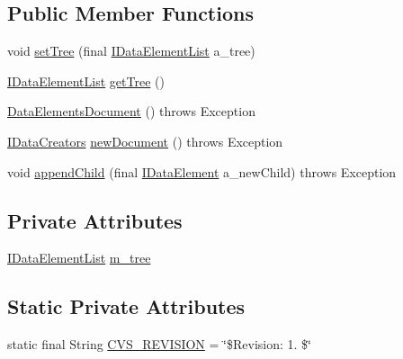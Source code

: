 \subsection*{Public Member Functions}
\begin{DoxyCompactItemize}
\item 
void \hyperlink{classorg_1_1jgap_1_1data_1_1_data_elements_document_a501abddaa9785533fab69835793c707d}{set\-Tree} (final \hyperlink{interfaceorg_1_1jgap_1_1data_1_1_i_data_element_list}{I\-Data\-Element\-List} a\-\_\-tree)
\item 
\hyperlink{interfaceorg_1_1jgap_1_1data_1_1_i_data_element_list}{I\-Data\-Element\-List} \hyperlink{classorg_1_1jgap_1_1data_1_1_data_elements_document_ac3290fdfcf6e71391fbf783c6aa0ffc9}{get\-Tree} ()
\item 
\hyperlink{classorg_1_1jgap_1_1data_1_1_data_elements_document_a0e9c99f7b7e45029e52626552aa84e23}{Data\-Elements\-Document} ()  throws Exception 
\item 
\hyperlink{interfaceorg_1_1jgap_1_1data_1_1_i_data_creators}{I\-Data\-Creators} \hyperlink{classorg_1_1jgap_1_1data_1_1_data_elements_document_abc37b0421a3f0694a0cd99e0f4bfb58f}{new\-Document} ()  throws Exception 
\item 
void \hyperlink{classorg_1_1jgap_1_1data_1_1_data_elements_document_a6ee8ba6e89acef01ed6ced25acae6027}{append\-Child} (final \hyperlink{interfaceorg_1_1jgap_1_1data_1_1_i_data_element}{I\-Data\-Element} a\-\_\-new\-Child)  throws Exception 
\end{DoxyCompactItemize}
\subsection*{Private Attributes}
\begin{DoxyCompactItemize}
\item 
\hyperlink{interfaceorg_1_1jgap_1_1data_1_1_i_data_element_list}{I\-Data\-Element\-List} \hyperlink{classorg_1_1jgap_1_1data_1_1_data_elements_document_a86ba3ecbb890335a70bf91743f4471fb}{m\-\_\-tree}
\end{DoxyCompactItemize}
\subsection*{Static Private Attributes}
\begin{DoxyCompactItemize}
\item 
static final String \hyperlink{classorg_1_1jgap_1_1data_1_1_data_elements_document_afb77a48884ce6ecf2b430a9cffbed059}{C\-V\-S\-\_\-\-R\-E\-V\-I\-S\-I\-O\-N} = \char`\"{}\$Revision\-: 1. \$\char`\"{}
\end{DoxyCompactItemize}
